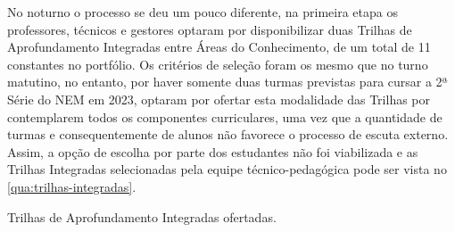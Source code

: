 No noturno o processo se deu um pouco diferente, na primeira etapa os professores, técnicos e gestores optaram por disponibilizar duas Trilhas de Aprofundamento Integradas entre Áreas do Conhecimento, de um total de 11 constantes no portfólio. Os critérios de seleção foram os mesmo que no turno matutino, no entanto, por haver somente duas turmas previstas para cursar a 2ª Série do \ac{NEM} em 2023, optaram por ofertar esta modalidade das Trilhas por contemplarem todos os componentes curriculares, uma vez que a quantidade de turmas e consequentemente de alunos não favorece o processo de escuta externo. Assim, a opção de escolha por parte dos estudantes não foi viabilizada e as Trilhas Integradas selecionadas pela equipe técnico-pedagógica pode ser vista no \autoref{qua:trilhas-integradas}.

\begin{quadro}[!ht]
	\caption{Trilhas de Aprofundamento Integradas ofertadas.}
	\label{qua:trilhas-integradas}
\end{quadro}

